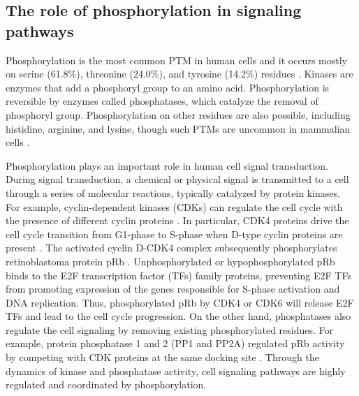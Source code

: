 \subsection{The role of phosphorylation in signaling pathways}
Phosphorylation is the most common PTM in human cells and it occurs mostly on serine (61.8\%), threonine (24.0\%), and tyrosine (14.2\%) residues \cite{hornbeckpv_sullivanm:PhosphoSitePlusComprehensive2012}. Kinases are enzymes that add a phosphoryl group to an amino acid. Phosphorylation is reversible by enzymes called phosphatases, which catalyze the removal of phosphoryl group. Phosphorylation on other residues are also possible, including histidine, arginine, and lysine, though such PTMs are uncommon in mammalian cells \cite{whitefm_wolf-yadlina:MethodsAnalysis2016}.

Phosphorylation plays an important role in human cell signal transduction. During signal transduction, a chemical or physical signal is transmitted to a cell through a series of molecular reactions, typically catalyzed by protein kinases. For example, cyclin-dependent kinases (CDKs) can regulate the cell cycle with the presence of different cyclin proteins \cite{malumbresm_malumbresm:CyclindependentKinases2014}. In particular, CDK4 proteins drive the cell cycle transition from G1-phase to S-phase when D-type cyclin proteins are present \cite{olearyb_turnernc:TreatingCancer2016}. The activated cyclin D-CDK4 complex subsequently phosphorylates retinoblastoma protein pRb \cite{narasimhaam_dowdysf:CyclinActivates2014}. Unphosphorylated or hypophosphorylated pRb binds to the E2F transcription factor (TFs) family proteins, preventing E2F TFs from promoting expression of the genes responsible for S-phase activation and DNA replication. Thus, phosphorylated pRb by CDK4 or CDK6 will release E2F TFs and lead to the cell cycle progression. On the other hand, phosphatases also regulate the cell signaling by removing existing phosphorylated residues. For example, protein phosphatase 1 and 2 (PP1 and PP2A) regulated pRb activity by competing with CDK proteins at the same docking site \cite{wlodarchakn_xingy:PP2AMaster2016}. Through the dynamics of kinase and phosphatase activity, cell signaling pathways are highly regulated and coordinated by phosphorylation.


